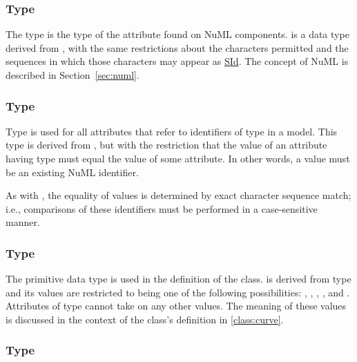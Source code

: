 \subsubsection[\element{NuMLSId}]{Type }
\label{type:numlsid}
The type  is the type of the  attribute found on NuML components.  is a data type derived from \SId, with the same restrictions about the characters permitted and the sequences in which those characters may appear as \hyperref[type:sid]{SId}. The concept of NuML is described in Section~\ref{sec:numl}.

\subsubsection[\element{NuMLSIdRef}]{Type }
\label{type:numlsidref}
Type  is used for all attributes that refer to identifiers of type \hyperref[type:numlsid]{} in a model. This type is derived from \hyperref[type:numlsid]{}, but with the restriction that the value of an attribute having type  must equal the value of some \hyperref[type:numlsid]{} attribute. In other words, a  value must be an existing NuML identifier.

As with \hyperref[type:numlsid]{}, the equality of  values is determined by exact character sequence match; i.e., comparisons of these identifiers must be performed in a case-sensitive manner.

\subsubsection[\element{CurveType}]{Type }
\label{type:curveType}

The  primitive data type is used in the definition of the \Curve class.   is derived from type  and its values are restricted to being one of the following possibilities: , , , , and .  Attributes of type  cannot take on any other values.  The meaning of these values is discussed in the context of the \Curve class's definition in \ref{class:curve}.

\subsubsection[\element{SurfaceType}]{Type }
\label{type:surfaceType}

